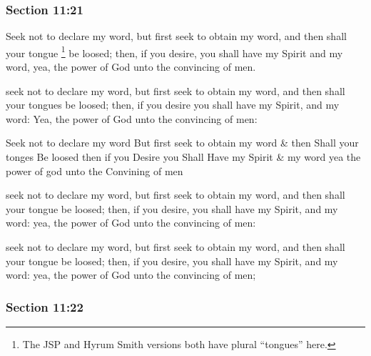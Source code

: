 	\subsubsection{Section 11:21} %
		\label{DC11-21}

		Seek not to declare my word, but first seek to obtain my word, and then shall your tongue%
			\footnote{%
				The JSP and Hyrum Smith versions both have plural ``tongues'' here.
				}
		be loosed; then, if you desire, you shall have my Spirit and my word, yea, the power of God unto the convincing of men.

		\begin{framed}
		\scriptsize
			\begin{compactdesc}
				\item[JSP] seek not to declare my word, but first seek to obtain my word, and then shall your tongues be loosed; then, if you desire you shall have my Spirit, and my word: Yea, the power of God unto the convincing of men: 
				\item[HS] Seek not to declare my word But first seek to obtain my word \& then Shall your tonges Be loosed then if you Desire you Shall Have my Spirit \& my word yea the power of god unto the Convining of men 
				\item[DC 1835] seek not to declare my word, but first seek to obtain my word, and then shall your tongue be loosed; then, if you desire, you shall have my Spirit, and my word: yea, the power of God unto the convincing of men: 
				\item[DC 1844] seek not to declare my word, but first seek to obtain my word, and then shall your tongue be loosed; then, if you desire, you shall have my Spirit, and my word: yea, the power of God unto the convincing of men; 
			\end{compactdesc}
		\end{framed}

	\subsubsection{Section 11:22} %
		\label{DC11-22}

